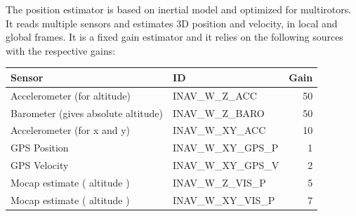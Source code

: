 The position estimator is based on inertial model and optimized for multirotors. It reads multiple sensors and estimates 3D position and velocity, in local and global frames. It is a fixed gain estimator and it relies on the following sources with the respective gains:
\begin{table}[H]
		\centering
	\begin{tabular}{l l r}
		\textbf{Sensor} & \textbf{ID} & \textbf{Gain} \\ \hline
		Accelerometer (for altitude) & INAV\_W\_Z\_ACC & 50 \\
		Barometer (gives absolute altitude)  & INAV\_W\_Z\_BARO & 50  \\
		Accelerometer (for x and y) & INAV\_W\_XY\_ACC & 10 \\
		GPS Position & INAV\_W\_XY\_GPS\_P & 1 \\
		GPS Velocity & INAV\_W\_XY\_GPS\_V & 2 \\
		Mocap estimate ( altitude ) & INAV\_W\_Z\_VIS\_P & 5 \\
		Mocap estimate ( altitude ) & INAV\_W\_XY\_VIS\_P & 7 \\
	\end{tabular}
\end{table}
 





